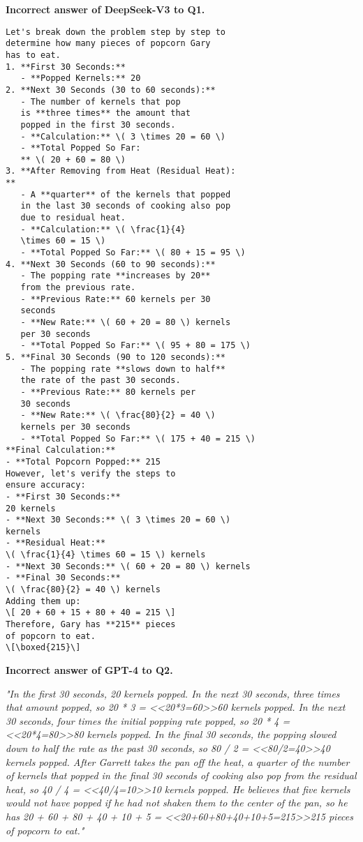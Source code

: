 \textbf{Incorrect answer of DeepSeek-V3 to Q1.}
\begin{tcolorbox}[
   enhanced,             %
   breakable,            %
   colback=yellow!2!white,
   colframe=black,
   boxrule=0.5pt
]
\small
\begin{verbatim}
Let's break down the problem step by step to 
determine how many pieces of popcorn Gary 
has to eat.
1. **First 30 Seconds:**
   - **Popped Kernels:** 20
2. **Next 30 Seconds (30 to 60 seconds):**
   - The number of kernels that pop 
   is **three times** the amount that 
   popped in the first 30 seconds.
   - **Calculation:** \( 3 \times 20 = 60 \)
   - **Total Popped So Far:
   ** \( 20 + 60 = 80 \)
3. **After Removing from Heat (Residual Heat):
**
   - A **quarter** of the kernels that popped 
   in the last 30 seconds of cooking also pop 
   due to residual heat.
   - **Calculation:** \( \frac{1}{4} 
   \times 60 = 15 \)
   - **Total Popped So Far:** \( 80 + 15 = 95 \)
4. **Next 30 Seconds (60 to 90 seconds):**
   - The popping rate **increases by 20** 
   from the previous rate.
   - **Previous Rate:** 60 kernels per 30 
   seconds
   - **New Rate:** \( 60 + 20 = 80 \) kernels 
   per 30 seconds
   - **Total Popped So Far:** \( 95 + 80 = 175 \)
5. **Final 30 Seconds (90 to 120 seconds):**
   - The popping rate **slows down to half** 
   the rate of the past 30 seconds.
   - **Previous Rate:** 80 kernels per 
   30 seconds
   - **New Rate:** \( \frac{80}{2} = 40 \) 
   kernels per 30 seconds
   - **Total Popped So Far:** \( 175 + 40 = 215 \)
**Final Calculation:**
- **Total Popcorn Popped:** 215
However, let's verify the steps to 
ensure accuracy:
- **First 30 Seconds:** 
20 kernels
- **Next 30 Seconds:** \( 3 \times 20 = 60 \) 
kernels
- **Residual Heat:** 
\( \frac{1}{4} \times 60 = 15 \) kernels
- **Next 30 Seconds:** \( 60 + 20 = 80 \) kernels
- **Final 30 Seconds:** 
\( \frac{80}{2} = 40 \) kernels
Adding them up:
\[ 20 + 60 + 15 + 80 + 40 = 215 \]
Therefore, Gary has **215** pieces 
of popcorn to eat.
\[\boxed{215}\]
\end{verbatim}
\end{tcolorbox}

\newpage

\textbf{Incorrect answer of GPT-4 to Q2.}
\begin{tcolorbox}[colback=yellow!2!white, colframe=black, boxrule=0.5pt]
\small
\textit{"In the first 30 seconds, 20 kernels popped.
In the next 30 seconds, three times that amount popped, so 20 * 3 = <<20*3=60>>60 kernels popped.
In the next 30 seconds, four times the initial popping rate popped, so 20 * 4 = <<20*4=80>>80 kernels popped.
In the final 30 seconds, the popping slowed down to half the rate as the past 30 seconds, so 80 / 2 = <<80/2=40>>40 kernels popped.
After Garrett takes the pan off the heat, a quarter of the number of kernels that popped in the final 30 seconds of cooking also pop from the residual heat, so 40 / 4 = <<40/4=10>>10 kernels popped.
He believes that five kernels would not have popped if he had not shaken them to the center of the pan, so he has 20 + 60 + 80 + 40 + 10 + 5 = <<20+60+80+40+10+5=215>>215 pieces of popcorn to eat."}
\end{tcolorbox}
